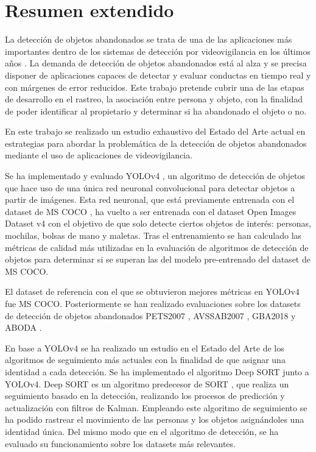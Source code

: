 
\chapter*{Resumen extendido}
\label{cha:resumen-extendido}


La detección de objetos abandonados se trata de una de las aplicaciones más importantes dentro de los sistemas de detección por videovigilancia en los últimos años \cite{DBLP:journals/spm/PlataniotisR05}. La demanda de detección de objetos abandonados está al alza y se precisa disponer de aplicaciones capaces de detectar y evaluar conductas en tiempo real y con márgenes de error reducidos. Este trabajo pretende cubrir una de las etapas de desarrollo en el rastreo, la asociación entre persona y objeto, con la finalidad de poder identificar al propietario y determinar si ha abandonado el objeto o no.

En este trabajo se realizado un estudio exhaustivo del Estado del Arte actual en estrategias para abordar la problemática de la detección de objetos abandonados mediante el uso de aplicaciones de videovigilancia.

Se ha implementado y evaluado YOLOv4 \cite{bochkovskiy2020yolov4}, un algoritmo de detección de objetos que hace uso de una única red neuronal convolucional para detectar objetos a partir de imágenes. Esta red neuronal, que está previamente entrenada con el dataset de MS COCO \cite{lin2015microsoft}, ha vuelto a ser entrenada con el dataset Open Images Dataset v4 \cite{Kuznetsova_2020} con el objetivo de que solo detecte ciertos objetos de interés: personas, mochilas, bolsas de mano y maletas. Tras el entrenamiento se han calculado las métricas de calidad más utilizadas en la evaluación de algoritmos de detección de objetos para determinar si se superan las del modelo pre-entrenado del dataset de MS COCO.

El dataset de referencia con el que se obtuvieron mejores métricas en YOLOv4 fue MS COCO. Posteriormente se han realizado evaluaciones sobre los datasets de detección de objetos abandonados PETS2007 \cite{pets2007-dataset}, AVSSAB2007 \cite{AVSSAB2007-dataset}, GBA2018 \cite{gba-dataset} y ABODA \cite{aboda-dataset}. 

En base a YOLOv4 se ha realizado un estudio en el Estado del Arte de los algoritmos de seguimiento más actuales con la finalidad de que asignar una identidad a cada detección. Se ha implementado el algoritmo Deep SORT \cite{Wojke2017simple} junto a YOLOv4. Deep SORT es un algoritmo predecesor de SORT \cite{Bewley_2016}, que realiza un seguimiento basado en la detección, realizando los procesos de predicción y actualización con filtros de Kalman. Empleando este algoritmo de seguimiento se ha podido rastrear el movimiento de las personas y los objetos asignándoles una identidad única. Del mismo modo que en el algoritmo de detección, se ha evaluado su funcionamiento sobre los datasets más relevantes.

